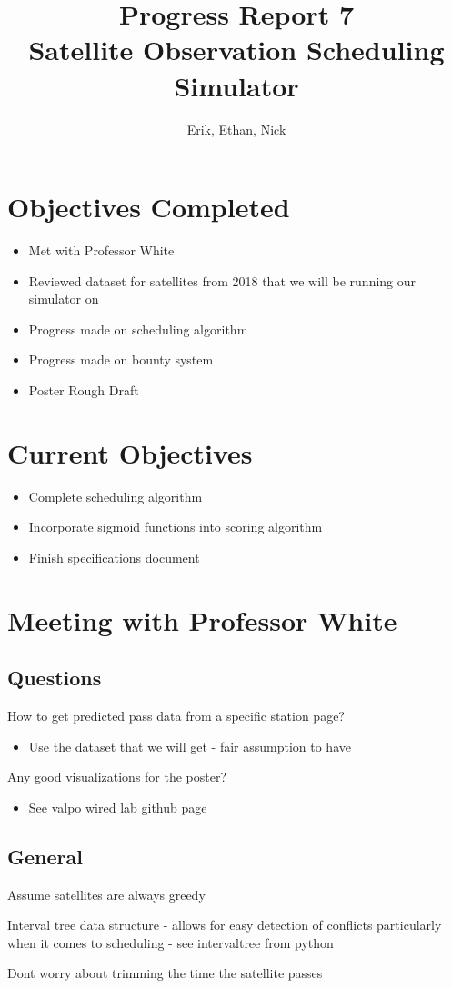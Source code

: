 \documentclass{article}
\title{Progress Report 7\\ Satellite Observation Scheduling Simulator}
\author{Erik, Ethan, Nick}
\begin{document}
\maketitle

\section{Objectives Completed}

\begin{itemize}
	\item Met with Professor White
	\item Reviewed dataset for satellites from 2018 that we will be running our simulator on
	\item Progress made on scheduling algorithm
	\item Progress made on bounty system
	\item Poster Rough Draft
\end{itemize}

\section{Current Objectives}

\begin{itemize}
  \item Complete scheduling algorithm
  \item Incorporate sigmoid functions into scoring algorithm
  \item Finish specifications document
\end{itemize}

\section{Meeting with Professor White}
\subsection{Questions}
How to get predicted pass data from a specific station page?

\begin{itemize}
\item Use the dataset that we will get - fair assumption to have
\end{itemize}

Any good visualizations for the poster?

\begin{itemize}
\item See valpo wired lab github page
\end{itemize}

\subsection{General}

Assume satellites are always greedy

Interval tree data structure - allows for easy detection of conflicts particularly when it comes to scheduling - see intervaltree from python

Dont worry about trimming the time the satellite passes
\end{document}
